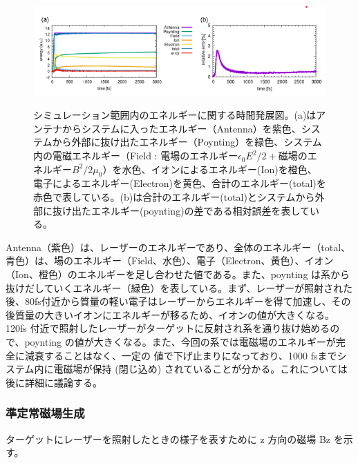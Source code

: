 \documentclass[a4paper,11pt,titlepage]{jarticle}
\numberwithin{equation}{section} %
\begin{document}
  \begin{figure}[H]
    \begin{center}
      \includegraphics[scale=0.8]{./image/4-7-2rod_dynamics.png}
      \label{fig:4-6}
      \caption{シミュレーション範囲内のエネルギーに関する時間発展図。(a)はアンテナからシステムに入ったエネルギー（Antenna）を紫色、システムから外部に抜け出たエネルギー（Poynting）を緑色、システム内の電磁エネルギー（Field : 電場のエネルギー$\epsilon_0E^{2}/2　+$磁場のエネルギー$B^{2}/2\mu_0$）を水色、イオンによるエネルギー(Ion)を橙色、電子によるエネルギー(Electron)を黄色、合計のエネルギー(total)を赤色で表している。(b)は合計のエネルギー(total)とシステムから外部に抜け出たエネルギー(poynting)の差である相対誤差を表している。}
    \end{center}
  \end{figure}
  
  Antenna（紫色）は、レーザーのエネルギーであり、全体のエネルギー（total、青色）は、場のエネルギー（Field、水色）、電子（Electron、黄色）、イオン（Ion、橙色）のエネルギーを足し合わせた値である。また、poynting は系から抜けだしていくエネルギー（緑色）を表している。まず、レーザーが照射された後、80fs付近から質量の軽い電子はレーザーからエネルギーを得て加速し、その後質量の大きいイオンにエネルギーが移るため、イオンの値が大きくなる。120fs 付近で照射したレーザーがターゲットに反射され系を通り抜け始めるので、poynting の値が大きくなる。また、今回の系では電磁場のエネルギーが完全に減衰することはなく、一定の
  値で下げ止まりになっており、1000 fsまでシステム内に電磁場が保持 (閉じ込め) されていることが分かる。これについては後に詳細に議論する。

  \subsubsection{準定常磁場生成}

  ターゲットにレーザーを照射したときの様子を表すために z 方向の磁場 Bz を示す。
  
\end{document}
